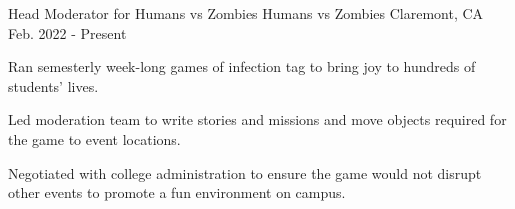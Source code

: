 

\begin{cventries}

  \cventry
    {Head Moderator for Humans vs Zombies} %
    {Humans vs Zombies} %
    {Claremont, CA} %
    {Feb. 2022 - Present} %
    {
    \begin{cvitems}
      \item{
      Ran semesterly week-long games of infection tag to bring joy to hundreds of students' lives.
      \item{
      Led moderation team to write stories and missions and move objects required for the game to event locations.
      }
      \item{
      Negotiated with college administration to ensure the game would not disrupt other events to promote a fun environment on campus.
      }
      }
    \end{cvitems}
    }

\end{cventries}
